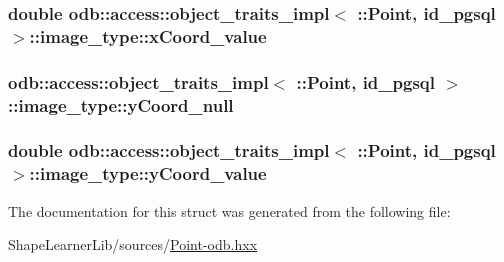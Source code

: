\subsubsection[{x\+Coord\+\_\+value}]{\setlength{\rightskip}{0pt plus 5cm}double odb\+::access\+::object\+\_\+traits\+\_\+impl$<$ \+::{\bf Point}, id\+\_\+pgsql $>$\+::image\+\_\+type\+::x\+Coord\+\_\+value}\label{structodb_1_1access_1_1object__traits__impl_3_01_1_1_point_00_01id__pgsql_01_4_1_1image__type_a59d2aadb36d26ff06bf5091ef292a4d7}
\hypertarget{structodb_1_1access_1_1object__traits__impl_3_01_1_1_point_00_01id__pgsql_01_4_1_1image__type_adef4148fe642acc437293ac780d6d74a}{}
\subsubsection[{y\+Coord\+\_\+null}]{ odb\+::access\+::object\+\_\+traits\+\_\+impl$<$ \+::{\bf Point}, id\+\_\+pgsql $>$\+::image\+\_\+type\+::y\+Coord\+\_\+null}\label{structodb_1_1access_1_1object__traits__impl_3_01_1_1_point_00_01id__pgsql_01_4_1_1image__type_adef4148fe642acc437293ac780d6d74a}
\hypertarget{structodb_1_1access_1_1object__traits__impl_3_01_1_1_point_00_01id__pgsql_01_4_1_1image__type_aa170b0c793ea0df0871b1e784542516f}{}
\subsubsection[{y\+Coord\+\_\+value}]{\setlength{\rightskip}{0pt plus 5cm}double odb\+::access\+::object\+\_\+traits\+\_\+impl$<$ \+::{\bf Point}, id\+\_\+pgsql $>$\+::image\+\_\+type\+::y\+Coord\+\_\+value}\label{structodb_1_1access_1_1object__traits__impl_3_01_1_1_point_00_01id__pgsql_01_4_1_1image__type_aa170b0c793ea0df0871b1e784542516f}


The documentation for this struct was generated from the following file\+:\begin{DoxyCompactItemize}
\item 
Shape\+Learner\+Lib/sources/\hyperlink{_point-odb_8hxx}{Point-\/odb.\+hxx}\end{DoxyCompactItemize}
